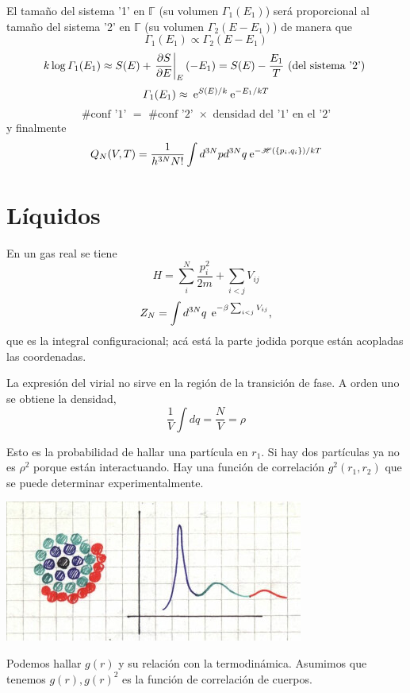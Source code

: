 \documentclass[10pt,oneside]{CBFT_book}
\begin{document}
El tamaño del sistema '1' en $\mathbb{\Gamma}$ (su volumen $\Gamma_1(E_1)$) será proporcional al tamaño del sistema 
'2' en $\mathbb{\Gamma}$ (su volumen $\Gamma_2(E-E_1)$) de manera que 
\[
	\Gamma_1(E_1) \propto \Gamma_2(E-E_1)
\]
\[
	k\log \Gamma_1(E_1) \approx S(E) + \left.\frac{\partial^{\hspace{-0.05em}} {S}}{\partial {E}^{\hspace{-0.05em}}}\right|_E (-E_1) = S(E) - \frac{E_1}{T} 
	\text{ (del sistema '2') }
\]
\[
	\Gamma_1(E_1) \approx \:\mathrm{e}^{S(E)/k} \:\mathrm{e}^{-E_1/kT} 
\]
\[
	\text{ \# conf '1' } = \text{ \# conf '2' } \times \text{ densidad del '1' en el '2' }
\]
y finalmente
\[
	Q_N (V,T) = \frac{1}{h^{3N}N!} \int d^{3N}p d^{3N}q \:\mathrm{e}^{-\mathscr{H}(\{ p_i,q_i\})/kT}
\]

\section{Líquidos}

En un gas real se tiene
\[
	H = \sum_i^N \frac{p_i^2}{2m} + \sum_{i<j} V_{ij}
\]
\[
	Z_N = \int d^{3N}q \: \:\mathrm{e}^{ - \beta \sum_{i<j} V_{ij} },
\]
que es la integral configuracional; acá está la parte jodida porque están acopladas las coordenadas.

La expresión del virial no sirve en la región de la transición de fase.
A orden uno se obtiene la densidad,
\[
	\frac{1}{V} \int dq = \frac{N}{V} = \rho 
\]

Esto es la probabilidad de hallar una partícula en $r_1$. Si hay dos partículas ya no es $\rho^2$ porque
están interactuando. Hay una función de correlación $g^2(r_1,r_2)$ que se puede determinar experimentalmente.


\includegraphics[scale=0.5]{images/1606329384.jpg} 

Podemos hallar $g(r)$ y su relación con la termodinámica. Asumimos que tenemos $g(r), g(r)^2$ es la función
de correlación de cuerpos.
\end{document}
